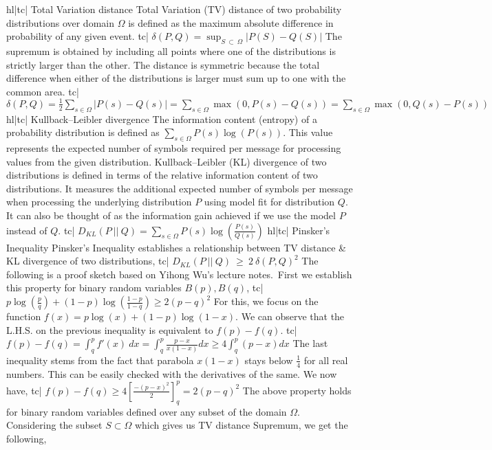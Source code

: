 hl|tc| Total Variation distance
Total Variation (TV) distance of two probability distributions over domain \(\Omega\) is defined as the maximum absolute difference in probability of any given event.
tc| \( \delta(P, Q) = \sup_{S \ \subset \ \Omega} | P(S) - Q(S) | \)
The supremum is obtained by including all points where one of the distributions is strictly larger than the other. The distance is symmetric because the total difference when either of the distributions is larger must sum up to one with the common area.
tc| \( \delta(P, Q) = \frac{1}{2} \sum_{s \in \Omega} |P(s) - Q(s)| = \sum_{s \in \Omega} \max(0, P(s) - Q(s)) = \sum_{s \in \Omega} \max(0, Q(s) - P(s)) \)
hl|tc| Kullback–Leibler divergence
The information content (entropy) of a probability distribution is defined as \( \sum_{s \in \Omega} P(s) \log(P(s)) \). This value represents the expected number of symbols required per message for processing values from the given distribution.
Kullback–Leibler (KL) divergence of two distributions is defined in terms of the relative information content of two distributions. It measures the additional expected number of symbols per message when processing the underlying distribution \(P\) using model fit for distribution \(Q\). It can also be thought of as the information gain achieved if we use the model \(P\) instead of \(Q\).
tc| \( D_{KL} (P \ || \ Q) = \sum_{s \in \Omega} P(s) \log \left(\frac{P(s)}{Q(s)}\right) \)
hl|tc| Pinsker's Inequality
Pinsker's Inequality establishes a relationship between TV distance & KL divergence of two distributions,
tc| \( D_{KL} (P \ || \ Q) \ \ge \ 2 \ \delta(P, Q)^2 \)
The following is a proof sketch based on Yihong Wu's lecture notes. First we establish this property for binary random variables \( B(p), B(q) \),
tc| \( p \log{ \left( \frac{p}{q} \right) } + (1-p) \log{ \left( \frac{1-p}{1-q} \right) \ge 2(p-q)^2 } \)
For this, we focus on the function \( f(x) = p \log (x) + (1 - p) \log (1 - x) \). We can observe that the L.H.S. on the previous inequality is equivalent to \( f(p) - f(q) \).
tc| \( f(p) - f(q) = \int_q^p f'(x) \ dx = \int_q^p \frac{p - x}{x (1 - x)} dx \ge 4 \int_q^p (p - x) dx \)
The last inequality stems from the fact that parabola \( x (1-x) \) stays below \( \frac{1}{4} \) for all real numbers. This can be easily checked with the derivatives of the same. We now have,
tc| \( f(p) - f(q) \ge 4 \left[ \frac{-(p-x)^2}{2} \right]_q^p = 2 (p - q)^2 \)
The above property holds for binary random variables defined over any subset of the domain \( \Omega \). Considering the subset \( S \subset \Omega \) which gives us TV distance Supremum, we get the following,

